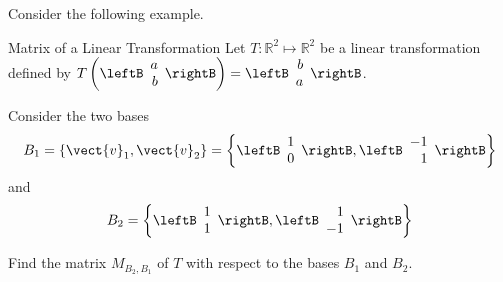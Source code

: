 Consider the following example.

\begin{example}{Matrix of a Linear Transformation}\label{exa:matrixlintransf}
Let $T: \mathbb{R}^2 \mapsto \mathbb{R}^2$ be a linear transformation defined by $T \left( \leftB \begin{array}{r}
a \\
b
\end{array} \rightB \right) = \leftB \begin{array}{r}
b \\
a 
\end{array} \rightB$. 

Consider the two bases
\[
B_1 = \left\{ \vect{v}_{1}, \vect{v}_{2} \right\} = \left\{ \leftB \begin{array}{r}
1 \\
0
\end{array}\rightB, \leftB \begin{array}{r}
-1 \\
1
\end{array}
\rightB
\right\}
\]
 and 
\[
B_2 = \left\{ \leftB \begin{array}{r}
1 \\
1
\end{array}
\rightB, \leftB \begin{array}{r}
1 \\
-1
\end{array}
\rightB
\right\}
\]

Find the matrix $M_{B_2,B_1}$ of $T$ with respect to the bases $B_1$ and $B_2$. 
\end{example}

